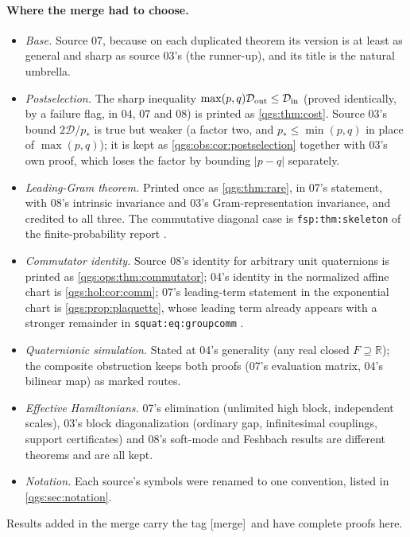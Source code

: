 \documentclass[11pt,oneside]{article}
\numberwithin{equation}{section}
\theoremstyle{plain}
\theoremstyle{definition}
\theoremstyle{remark}
\newcommand{\R}{\mathbb R}
\newcommand{\TD}{\mathcal D}
\newcommand{\abs}[1]{\left|#1\right|}
\newcommand{\merge}{{\small\textsf{[merge]}}}
\begin{document}
\paragraph{Where the merge had to choose.}
\begin{itemize}
\item \emph{Base.} Source 07, because on each duplicated theorem its version is at least as general and sharp as source 03's (the runner-up), and its title is the natural umbrella.
\item \emph{Postselection.} The sharp inequality $\max(p,q)\TD_{\rm out}\le\TD_{\rm in}$ (proved identically, by a failure flag, in 04, 07 and 08) is printed as \cref{qgs:thm:cost}. Source 03's bound $2\TD/p_*$ is true but weaker (a factor two, and $p_*\le\min(p,q)$ in place of $\max(p,q)$); it is kept as \cref{qgs:obs:cor:postselection} together with 03's own proof, which loses the factor by bounding $\abs{p-q}$ separately.
\item \emph{Leading-Gram theorem.} Printed once as \cref{qgs:thm:rare}, in 07's statement, with 08's intrinsic invariance and 03's Gram-representation invariance, and credited to all three. The commutative diagonal case is \texttt{fsp:thm:skeleton} of the finite-probability report \cite{repoProbability}.
\item \emph{Commutator identity.} Source 08's identity for arbitrary unit quaternions is printed as \cref{qgs:ops:thm:commutator}; 04's identity in the normalized affine chart is \cref{qgs:hol:cor:comm}; 07's leading-term statement in the exponential chart is \cref{qgs:prop:plaquette}, whose leading term already appears with a stronger remainder in \texttt{squat:eq:groupcomm} \cite{repoQuaternion}.
\item \emph{Quaternionic simulation.} Stated at 04's generality (any real closed $F\supseteq\R$); the composite obstruction keeps both proofs (07's evaluation matrix, 04's bilinear map) as marked routes.
\item \emph{Effective Hamiltonians.} 07's elimination (unlimited high block, independent scales), 03's block diagonalization (ordinary gap, infinitesimal couplings, support certificates) and 08's soft-mode and Feshbach results are different theorems and are all kept.
\item \emph{Notation.} Each source's symbols were renamed to one convention, listed in \cref{qgs:sec:notation}.
\end{itemize}
Results added in the merge carry the tag \merge\ and have complete proofs here.
\end{document}
